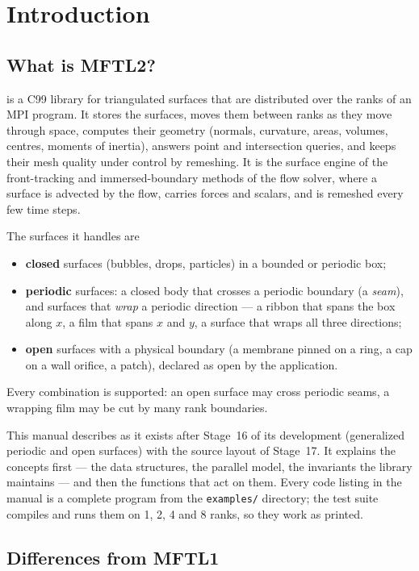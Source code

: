 \chapter{Introduction}
\label{ch:intro}

\section{What is MFTL2?}

\mftl{} is a C99 library for triangulated surfaces that are distributed over the ranks of an MPI
program. It stores the surfaces, moves them between ranks as they move through space, computes
their geometry (normals, curvature, areas, volumes, centres, moments of inertia), answers
point and intersection queries, and keeps their mesh quality under control by remeshing. It is
the surface engine of the front-tracking and immersed-boundary methods of the \multi{} flow
solver, where a surface is advected by the flow, carries forces and scalars, and is
remeshed every few time steps.

The surfaces it handles are
\begin{itemize}
  \item \textbf{closed} surfaces (bubbles, drops, particles) in a bounded or periodic box;
  \item \textbf{periodic} surfaces: a closed body that crosses a periodic boundary (a
    \emph{seam}), and surfaces that \emph{wrap} a periodic direction --- a ribbon that spans the
    box along $x$, a film that spans $x$ and $y$, a surface that wraps all three directions;
  \item \textbf{open} surfaces with a physical boundary (a membrane pinned on a ring, a cap on a
    wall orifice, a patch), declared as open by the application.
\end{itemize}
Every combination is supported: an open surface may cross periodic seams, a wrapping film may
be cut by many rank boundaries.

This manual describes \mftl{} as it exists after Stage~16 of its development (generalized
periodic and open surfaces) with the source layout of Stage~17. It explains the concepts
first --- the data structures, the parallel model, the invariants the library maintains ---
and then the functions that act on them. Every code listing in the manual is a complete
program from the \texttt{examples/} directory; the test suite compiles and runs them on 1, 2,
4 and 8 ranks, so they work as printed.

\section{Differences from MFTL1}
\label{sec:mftl1}

